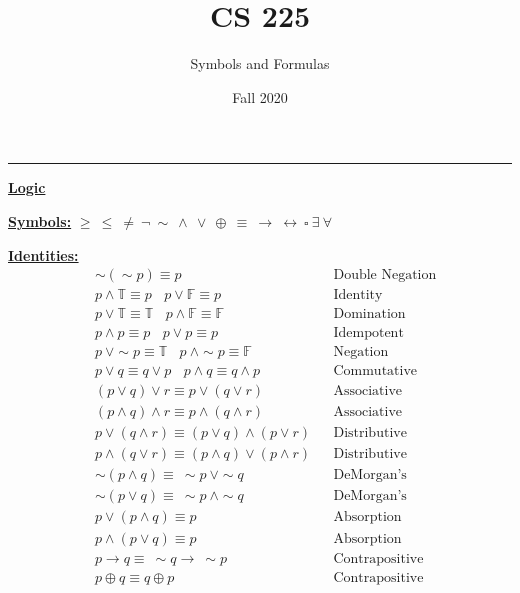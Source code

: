 \documentclass[11pt]{article}
\title{CS 225}
\author{Symbols and Formulas}
\date{Fall 2020}
\begin{document}
\maketitle
\hrule

\begin{center}\underline{\bf \huge Logic}\end{center}
\bigskip

\underline{\bf Symbols:} $\geq \ \leq \ \neq \ \neg \ \sim \ \wedge \ \vee \ \oplus \ \equiv \ \rightarrow \ \leftrightarrow \ \square \ \exists \ \forall$
\bigskip

\begin{minipage}[c]{0.4\textwidth}
\underline{\bf Identities:} 
\begin{align*}
    &\sim (\sim p) \equiv p &&\text{Double Negation} \\
    &p \wedge \mathbb{T} \equiv p \ \ \ \ p \vee \mathbb{F} \equiv p &&\text{Identity} \\
    &p \vee \mathbb{T} \equiv \mathbb{T} \ \ \ \ p \wedge \mathbb{F} \equiv \mathbb{F} &&\text{Domination} \\
    &p \wedge p \equiv p \ \ \ \ p \vee p \equiv p &&\text{Idempotent} \\
    &p \ \vee \sim p \equiv \mathbb{T} \ \ \ \ p \ \wedge \sim p \equiv \mathbb{F} &&\text{Negation} \\
    &p \vee q \equiv q \vee p \ \ \ \ p \wedge q \equiv q \wedge p &&\text{Commutative} \\
    &(p \vee q) \vee r \equiv p \vee (q \vee r) &&\text{Associative} \\
    &(p \wedge q) \wedge r \equiv p \wedge (q \wedge r) &&\text{Associative} \\
    &p \vee (q \wedge r) \equiv (p \vee q) \wedge (p \vee r) &&\text{Distributive} \\
    &p \wedge (q \vee r) \equiv (p \wedge q) \vee (p \wedge r) &&\text{Distributive} \\
    &\sim (p \wedge q) \equiv \ \sim p \ \vee \sim q &&\text{DeMorgan's} \\
    &\sim(p \vee q) \equiv \ \sim p \ \wedge \sim q &&\text{DeMorgan's} \\
    &p \vee (p \wedge q) \equiv p &&\text{Absorption} \\
    &p \wedge (p \vee q) \equiv p &&\text{Absorption} \\
    &p \rightarrow q \equiv \ \sim q \rightarrow \ \sim p &&\text{Contrapositive} \\
    &p \oplus q \equiv q \oplus p &&\text{Contrapositive} \\

\end{align*}
\end{minipage}
\end{document}
